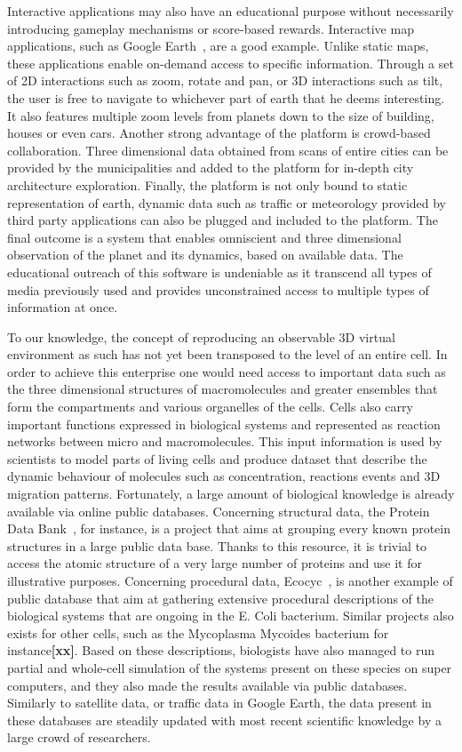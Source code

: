 Interactive applications may also have an educational purpose without necessarily introducing gameplay mechanisms or score-based rewards. 
Interactive map applications, such as Google Earth~\cite{gearth2001}, are a good example.
Unlike static maps, these applications enable on-demand access to specific information.
Through a set of 2D interactions such as zoom, rotate and pan, or 3D interactions such as tilt, the user is free to navigate to whichever part of earth that he deems interesting.
It also features multiple zoom levels from planets down to the size of building, houses or even cars.
Another strong advantage of the platform is crowd-based collaboration.
Three dimensional data obtained from scans of entire cities can be provided by the municipalities and added to the platform for in-depth city architecture exploration.
Finally, the platform is not only bound to static representation of earth, dynamic data such as traffic or meteorology provided by third party applications can also be plugged and included to the platform.
The final outcome is a system that enables omniscient and three dimensional observation of the planet and its dynamics, based on available data.
The educational outreach of this software is undeniable as it transcend all types of media previously used and provides unconstrained access to multiple types of information at once. 

To our knowledge, the concept of reproducing an observable 3D virtual environment as such has not yet been transposed to the level of an entire cell.
In order to achieve this enterprise one would need access to important data such as the three dimensional structures of macromolecules and greater ensembles that form the compartments and various organelles of the cells.
Cells also carry important functions expressed in biological systems and represented as reaction networks between micro and macromolecules.
This input information is used by scientists to model parts of living cells and produce dataset that describe the dynamic behaviour of molecules such as concentration, reactions events and 3D migration patterns.
Fortunately, a large amount of biological knowledge is already available via online public databases.
Concerning structural data, the Protein Data Bank~\cite{bernstein1977protein}, for instance, is a project that aims at grouping every known protein structures in a large public data base.
Thanks to this resource, it is trivial to access the atomic structure of a very large number of proteins and use it for illustrative purposes.
Concerning procedural data, Ecocyc~\cite{keseler2005ecocyc}, is another example of public database that aim at gathering extensive procedural descriptions of the biological systems that are ongoing in the E. Coli bacterium.
Similar projects also exists for other cells, such as the Mycoplasma Mycoides bacterium for instance\textbf{[xx]}.
Based on these descriptions, biologists have also managed to run partial and whole-cell simulation of the systems present on these species on super computers, and they also made the results available via public databases\cite{karr2014wholecellsimdb}.
Similarly to satellite data, or traffic data in Google Earth, the data present in these databases are steadily updated with most recent scientific knowledge by a large crowd of researchers.

